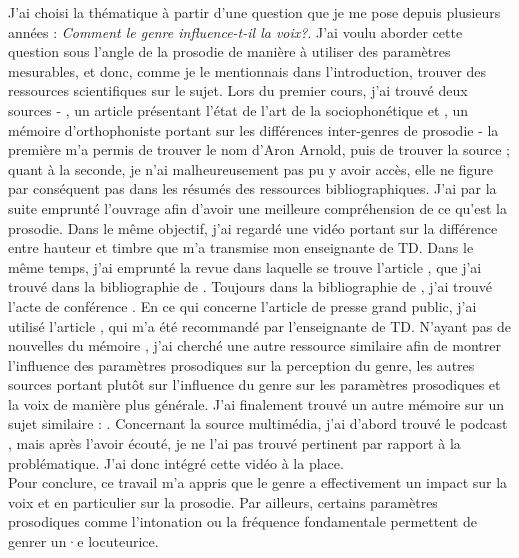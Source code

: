  J'ai choisi la thématique à partir d'une question que je me pose depuis plusieurs années : \textit{Comment le genre influence-t-il la voix?}. J'ai voulu aborder cette question sous l'angle de la prosodie de manière à utiliser des paramètres mesurables, et donc, comme je le mentionnais dans l'introduction, trouver des ressources scientifiques sur le sujet. %
 Lors du premier cours, j'ai trouvé deux sources - \parencite{Can15}, un article présentant l'état de l'art de la sociophonétique et \parencite{Lek16}, un mémoire d'orthophoniste portant sur les différences inter-genres de prosodie - la première m'a permis de trouver le nom d'Aron Arnold, puis de trouver la source \parencite{Pep20}; quant à la seconde, je n'ai malheureusement pas pu y avoir accès, elle ne figure par conséquent pas dans les résumés des ressources bibliographiques. 
 J'ai par la suite emprunté l'ouvrage \parencite{DiC13} afin d'avoir une meilleure compréhension de ce qu'est la prosodie. Dans le même objectif, j'ai regardé une vidéo portant sur la différence entre hauteur et timbre que m'a transmise mon enseignante de TD. 
 Dans le même temps, j'ai emprunté la revue dans laquelle se trouve l'article \parencite{Boe75}, que j'ai trouvé dans la bibliographie de \parencite{Pep20}.
 Toujours dans la bibliographie de \parencite{Pep20}, j'ai trouvé l'acte de conférence \parencite{Pep16}.
 En ce qui concerne l'article de presse grand public, j'ai utilisé l'article \parencite{Bro18}, qui m'a été recommandé par l'enseignante de TD.
 N'ayant pas de nouvelles du mémoire \parencite{Lek16}, j'ai cherché une autre ressource similaire afin de montrer l'influence des paramètres prosodiques sur la perception du genre, les autres sources portant plutôt sur l'influence du genre sur les paramètres prosodiques et la voix de manière plus générale. 
 J'ai finalement trouvé un autre mémoire sur un sujet similaire : \parencite{Gar22}.
 Concernant la source multimédia, j'ai d'abord trouvé le podcast \parencite{podcast}, mais après l'avoir écouté, je ne l'ai pas trouvé pertinent par rapport à la problématique.
 J'ai donc intégré cette vidéo \parencite{video} à la place.\\

 Pour conclure, ce travail m'a appris que le genre a effectivement un impact sur la voix et en particulier sur la prosodie. Par ailleurs, certains paramètres prosodiques comme l'intonation ou la fréquence fondamentale permettent de genrer un·e locuteurice.\\

